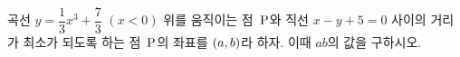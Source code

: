 곡선 $y=\dfrac{1}{3}x^3+\dfrac{7}{3}$ $(x<0)$ 위를 움직이는 점~$\mathrm{P}$와 직선 $x-y+5=0$ 사이의 거리가 최소가 되도록 하는 점~$\mathrm{P}$의 좌표를 $(a{,}\mkern3mu\mathopen{}b)$라 하자. 이때 $ab$의 값을 구하시오.
